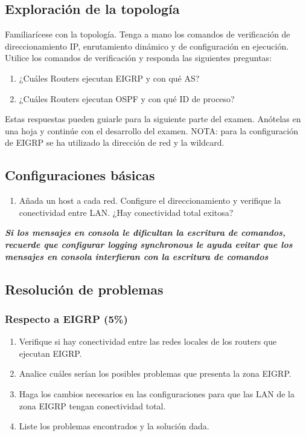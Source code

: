 \documentclass[12pt]{article}
\begin{document}
\subsection{Exploración de la topología}
Familiarícese con la topología. Tenga a mano los comandos de verificación de direccionamiento IP, enrutamiento dinámico y de configuración en ejecución.
 Utilice los comandos de verificación y responda las siguientes preguntas:
\begin{enumerate}[label=\Alph*]
\item ¿Cuáles Routers ejecutan EIGRP y con qué AS?
\item ¿Cuáles Routers ejecutan OSPF y con qué ID de proceso?
\end{enumerate}
Estas respuestas pueden guiarle para la siguiente parte del examen. Anótelas en una hoja y continúe con el desarrollo del examen. NOTA: para la configuración de EIGRP se ha utilizado la dirección de red y la wildcard.

\subsection{Configuraciones básicas}
\begin{enumerate}[label=\Alph*]
\item Añada un host a cada red. Configure el direccionamiento y verifique la conectividad entre LAN. ¿Hay conectividad total exitosa?
\end{enumerate}
\textit{\textbf{Si los mensajes en consola le dificultan la escritura de comandos, recuerde que configurar logging synchronous le ayuda evitar que los mensajes en consola interfieran con la escritura de comandos}} 

\subsection{Resolución de problemas}
\subsubsection{Respecto a \textbf{EIGRP} (5\%)}
\begin{enumerate}
\item Verifique si hay conectividad entre las redes locales de los routers que ejecutan EIGRP.
\item Analice cuáles serían los posibles problemas que presenta la zona EIGRP.
\item Haga los cambios necesarios en las configuraciones para que las LAN de la zona EIGRP tengan conectividad total.
\item Liste los problemas encontrados y la solución dada.
\end{enumerate}
\end{document}
